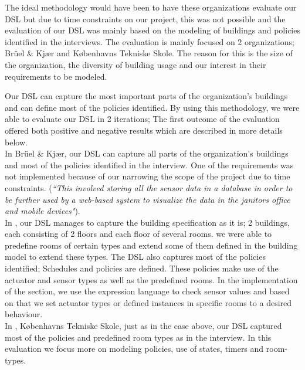 The ideal methodology would have been to have these organizations evaluate our DSL but due to time constraints on our project, this was not possible and the evaluation of our DSL was mainly based on the modeling of buildings and policies identified in the interviews. The evaluation is mainly focused on 2 organizations; Br\"{u}el \& Kj\ae r and K\o benhavns Tekniske Skole. The reason for this is the size of the organization, the diversity of building usage and our interest in their requirements to be modeled. 

Our DSL can capture the most important parts of the organization's buildings and can define most of the policies identified. By using this methodology, we were able to evaluate our DSL in 2 iterations; The first outcome of the evaluation offered both positive and negative results which are described in more details below.\\

In Br\"{u}el \& Kj\ae r, our DSL can capture all parts of the organization's buildings and most of the policies identified in the interview. One of the requirements was not implemented because of our narrowing the scope of the project due to time constraints. (\textit{``This involved storing all the sensor data in a database in order to be further used by a web-based system to visualize the data in the janitors office and mobile devices"}).\\
In , our DSL manages to capture the building specification as it is; 2 buildings, each consisting of 2 floors and each floor of several rooms. we were able to predefine rooms of certain types and extend some of them defined in the building model to extend these types. The DSL also captures most of the policies identified; Schedules and policies are defined. These policies make use of the actuator and sensor types as well as the predefined rooms. In the implementation of the section, we use the expression language to check sensor values and based on that we set actuator types or defined instances in specific rooms to a desired behaviour. \\

In , K\o benhavns Tekniske Skole, just as in the case above, our DSL captured most of the policies and predefined room types as in the interview. In this evaluation we focus more on modeling policies, use of states, timers and room-types.\\ 


